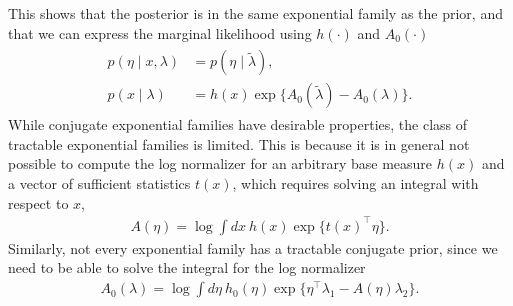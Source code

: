 \documentclass{article}
\begin{document}
This shows that the posterior is in the same exponential family as the prior, and that we can express the marginal likelihood using $h(\cdot)$ and $A_0(\cdot)$
\begin{align}
    \label{eq:cef-posterior-and-marginal}
    \begin{split}
    p(\eta \mid x, \lambda) &= p(\eta \mid \tilde{\lambda}),
    \\
    p(x \mid \lambda) &= h(x)\exp\big\{ A_0(\tilde{\lambda}) - A_0(\lambda) \big\}.
    \end{split}
\end{align}
While conjugate exponential families have desirable properties, the class of tractable exponential families is limited. This is because it is in general not possible to compute the log normalizer for an arbitrary base measure $h(x)$ and a vector of sufficient statistics $t(x)$, which requires solving an integral with respect to $x$,
\begin{align*}
    A(\eta) = \log \int dx \: h(x) \exp \big\{ t(x)^\top \eta  \}.
\end{align*}
Similarly, not every exponential family has a tractable conjugate prior, since we need to be able to solve the integral for the log normalizer 
\begin{align*}
    A_0(\lambda) = \log \int d\eta \: h_0(\eta) \exp \big\{ \eta^\top\lambda_1 - A(\eta)\lambda_2 \big\}.
\end{align*}


%
%



\end{document}
